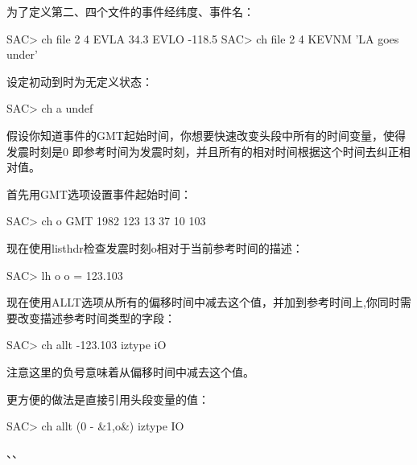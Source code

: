 为了定义第二、四个文件的事件经纬度、事件名：
\begin{SACCode}
SAC> ch file 2 4 EVLA 34.3 EVLO -118.5
SAC> ch file 2 4 KEVNM 'LA goes under'
\end{SACCode}

设定初动到时为无定义状态：
\begin{SACCode}
SAC> ch a undef
\end{SACCode}

假设你知道事件的GMT起始时间，你想要快速改变头段中所有的时间变量，使得发震时刻是0
即参考时间为发震时刻，并且所有的相对时间根据这个时间去纠正相对值。

首先用GMT选项设置事件起始时间：
\begin{SACCode}
SAC> ch o GMT 1982 123 13 37 10 103
\end{SACCode}
现在使用listhdr检查发震时刻o相对于当前参考时间的描述：
\begin{SACCode}
SAC> lh o
 o = 123.103
\end{SACCode}
现在使用ALLT选项从所有的偏移时间中减去这个值，并加到参考时间上,你同时需要改变描述参考时间类型的字段：
\begin{SACCode}
SAC> ch allt -123.103 iztype iO
\end{SACCode}
注意这里的负号意味着从偏移时间中减去这个值。

更方便的做法是直接引用头段变量的值：
\begin{SACCode}
SAC> ch allt (0 - &1,o&) iztype IO
\end{SACCode}

、、
